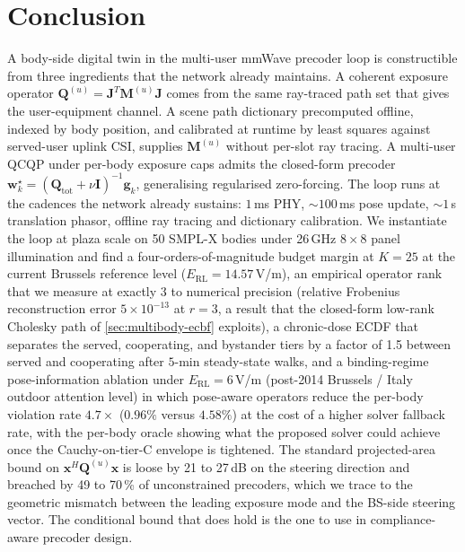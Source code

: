 \documentclass[journal,twocolumn,10pt]{IEEEtran}
\theoremstyle{plain}
\theoremstyle{remark}
\newcommand{\xx}{\mathbf{x}}
\newcommand{\ww}{\mathbf{w}}
\newcommand{\gvec}{\mathbf{g}}
\newcommand{\Qmat}{\mathbf{Q}}
\newcommand{\Mmat}{\mathbf{M}}
\newcommand{\Jmat}{\mathbf{J}}
\begin{document}
\section{Conclusion}\label{sec:conclusion}

A body-side digital twin in the multi-user mmWave precoder loop is
constructible from three ingredients that the network already
maintains. A coherent exposure operator $\Qmat^{(u)} = \Jmat^T
\Mmat^{(u)} \Jmat$ comes from the same ray-traced path set that
gives the user-equipment channel. A scene path dictionary
precomputed offline, indexed by body position, and calibrated at
runtime by least squares against served-user uplink CSI, supplies
$\Mmat^{(u)}$ without per-slot ray tracing. A multi-user QCQP under
per-body exposure caps admits the closed-form precoder
$\ww_k^\star = (\Qmat_{\mathrm{tot}} + \nu \mathbf{I})^{-1} \gvec_k$,
generalising regularised zero-forcing. The loop runs at the cadences
the network already sustains: $1\,$ms PHY, $\sim 100\,$ms pose
update, $\sim 1\,$s translation phasor, offline ray tracing and
dictionary calibration. We instantiate the loop at plaza scale on
50 SMPL-X bodies under 26\,GHz $8 \times 8$ panel illumination and
find a four-orders-of-magnitude budget margin at $K = 25$ at
the current Brussels reference level ($E_{\mathrm{RL}} = 14.57\,$V/m),
an empirical operator rank that we measure at exactly 3 to numerical
precision (relative Frobenius reconstruction error $5\times 10^{-13}$
at $r = 3$, a result that the closed-form low-rank Cholesky path of
\cref{sec:multibody-ecbf} exploits), a chronic-dose ECDF that
separates the served, cooperating, and bystander tiers by a factor
of 1.5 between served and cooperating after $5$-min steady-state
walks, and a binding-regime pose-information ablation under
$E_{\mathrm{RL}} = 6\,$V/m (post-2014 Brussels / Italy outdoor
attention level) in which pose-aware operators reduce the per-body
violation rate $4.7\times$ ($0.96\%$ versus $4.58\%$) at the cost of
a higher solver fallback rate, with the per-body oracle showing what
the proposed solver could achieve once the Cauchy-on-tier-C
envelope is tightened. The standard
projected-area bound on $\xx^H \Qmat^{(u)} \xx$ is loose by 21 to
27\,dB on the steering direction and breached by 49 to 70\,\% of
unconstrained precoders, which we trace to the geometric mismatch
between the leading exposure mode and the BS-side steering vector.
The conditional bound that does hold is the one to use in
compliance-aware precoder design.


\appendices
\end{document}
